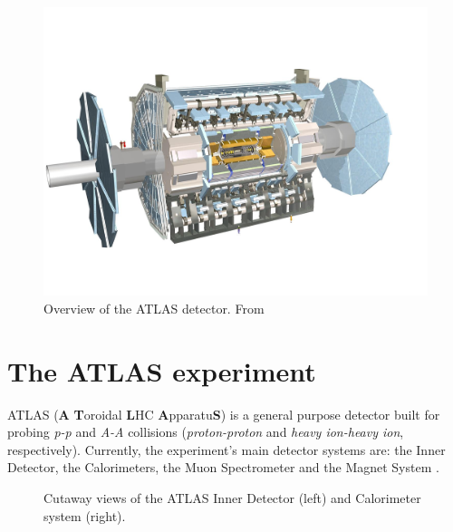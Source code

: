 \begin{figure}[!ht]
    \centering
    \includegraphics[width=.7\textwidth]{Images/intro/ATLAS_detector.jpg}
    \captionsetup{width=.8\linewidth}
    \caption{Overview of the ATLAS detector. From \cite{atlasDetectorTechnology}}
    \label{fig:ATLAS}
\end{figure}


\section{The ATLAS experiment}%

ATLAS (\textbf{A} \textbf{T}oroidal \textbf{L}HC \textbf{A}pparatu\textbf{S}) is a general purpose detector built for probing \textit{p-p} and \textit{A-A} collisions (\textit{proton-proton} and \textit{heavy ion-heavy ion}, respectively). Currently, the experiment's main detector systems are: the Inner Detector, the Calorimeters, the Muon Spectrometer and the Magnet System \cite{Collaboration_The_ATLAS2008}. 

\begin{figure}[hb]
    \centering
    \hfill
    \centering
    \caption{Cutaway views of the ATLAS Inner Detector (left) and Calorimeter system (right).}
\end{figure}


